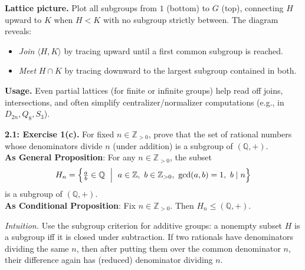 \documentclass[12pt]{article}
\theoremstyle{definition}
\begin{document}
\newpage

\medskip
\textbf{Lattice picture.} Plot all subgroups from $1$ (bottom) to $G$ (top), connecting $H$ upward to $K$ when $H<K$ with no subgroup strictly between. The diagram reveals:
\begin{itemize}\itemsep3pt
\item \emph{Join} $\langle H,K\rangle$ by tracing upward until a first common subgroup is reached.
\item \emph{Meet} $H\cap K$ by tracing downward to the largest subgroup contained in both.
\end{itemize}

\medskip
\textbf{Usage.} Even partial lattices (for finite or infinite groups) help read off joins, intersections, and often simplify centralizer/normalizer computations (e.g., in $D_{2n},Q_8,S_3$).

\newpage

\noindent \textbf{2.1: Exercise 1(c).} For fixed $n\in\mathbb Z_{>0}$, prove that the set of rational numbers whose denominators divide $n$ (under addition) is a subgroup of $(\mathbb Q,+)$.\\ %

\noindent\textbf{As General Proposition}: For any $n\in\mathbb Z_{>0}$, the subset
\[
H_n=\Bigl\{\tfrac{a}{b}\in\mathbb Q \ \Bigm|\ a\in\mathbb Z,\ b\in\mathbb Z_{>0},\ \gcd(a,b)=1,\ b\mid n\Bigr\}
\]
is a subgroup of $(\mathbb Q,+)$.\\

\noindent \textbf{As Conditional Proposition}: Fix $n\in\mathbb Z_{>0}$. Then $H_n\le (\mathbb Q,+)$.

\newpage

\dotfill

\emph{Intuition.} Use the subgroup criterion for additive groups: a nonempty subset $H$ is a subgroup iff it is closed under subtraction. If two rationals have denominators dividing the same $n$, then after putting them over the common denominator $n$, their difference again has (reduced) denominator dividing $n$.\\

\dotfill
\end{document}
